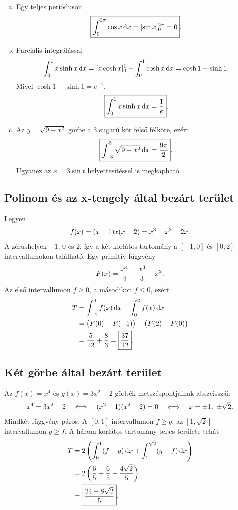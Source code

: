 \documentclass{szb-solution}
\begin{document}
\begin{enumerate}[a)]
  \item Egy teljes perióduson
        $$
          \boxed{\int_0^{2\pi}\cos x\mathop{}\!\mathrm{d} x
          =[\sin x]_0^{2\pi}=0}
          \text.
        $$

  \item Parciális integrálással
        $$
          \int_0^1x\sinh x\mathop{}\!\mathrm{d} x
          =[x\cosh x]_0^1-\int_0^1\cosh x\mathop{}\!\mathrm{d} x
          =\cosh1-\sinh1
          \text.
        $$
        Mivel $\cosh1-\sinh1=e^{-1}$,
        $$
          \boxed{\int_0^1x\sinh x\mathop{}\!\mathrm{d} x=\frac1e}
          \text.
        $$

  \item Az $y=\sqrt{9-x^2}$ görbe a $3$ sugarú kör felső félköre, ezért
        $$
          \boxed{\int_{-3}^3\sqrt{9-x^2}\mathop{}\!\mathrm{d} x=\frac{9\pi}{2}}
          \text.
        $$
        Ugyanez az $x=3\sin t$ helyettesítéssel is megkapható.
\end{enumerate}

\subsection{Polinom és az x-tengely által bezárt terület}

Legyen
$$
  f(x)=(x+1)x(x-2)=x^3-x^2-2x
  \text.
$$
A zérushelyek $-1$, $0$ és $2$, így a két korlátos tartomány a $[-1,0]$ és
$[0,2]$ intervallumokon található. Egy primitív függvény
$$
  F(x)=\frac{x^4}{4}-\frac{x^3}{3}-x^2
  \text.
$$
Az első intervallumon $f\geq0$, a másodikon $f\leq0$, ezért
\begin{align*}
  T
  &=\int_{-1}^0f(x)\mathop{}\!\mathrm{d} x-\int_0^2f(x)\mathop{}\!\mathrm{d} x\\
  &=\bigl(F(0)-F(-1)\bigr)-\bigl(F(2)-F(0)\bigr)\\
  &=\frac5{12}+\frac83
  =\boxed{\frac{37}{12}}
  \text.
\end{align*}

\subsection{Két görbe által bezárt terület}

Az $f(x)=x^4$ és $g(x)=3x^2-2$ görbék metszéspontjainak abszcisszái:
$$
  x^4=3x^2-2
  \quad\Longleftrightarrow\quad
  (x^2-1)(x^2-2)=0
  \quad\Longleftrightarrow\quad
  x=\pm1,\ \pm\sqrt2
  \text.
$$
Mindkét függvény páros. A $[0,1]$ intervallumon $f\geq g$, az
$[1,\sqrt2]$ intervallumon $g\geq f$. A három korlátos tartomány teljes
területe tehát
\begin{align*}
  T
  &=2\left(
    \int_0^1(f-g)\mathop{}\!\mathrm{d} x+
    \int_1^{\sqrt2}(g-f)\mathop{}\!\mathrm{d} x\right)\\
  &=2\left(\frac65+\frac65-\frac{4\sqrt2}{5}\right)\\
  &=\boxed{\frac{24-8\sqrt2}{5}}
  \text.
\end{align*}
\end{document}
